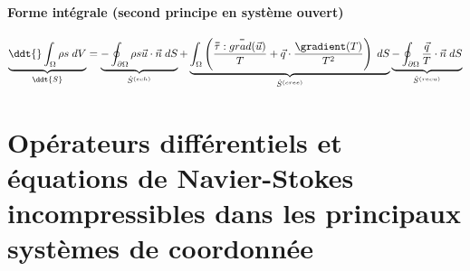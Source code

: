 \paragraph{Forme intégrale (second principe en système ouvert)}
\begin{equation}
		\underbrace{\ddt{} \int_{\Omega} \rho s \; dV
		}_{\ddt{S} }		 
		= \underbrace{  - \oint_{\partial \Omega}  \rho s \vec{u} \cdot \vec{n} \; dS
		}_{\dot{S}^{(ech)}}
		+ 
		\underbrace{ \int_{\Omega} \left( \frac{\mytensor{\tau} : \mytensor{grad}(\vec{u})}{T} + \vec{q} 		\cdot \frac{\gradient(T)}{T^2} 
		\right)   \; dS 
		}_{\dot{S}^{(cree)}} 
		 \underbrace{ - \oint_{\partial \Omega} \frac{\vec{q}}{T} \cdot \vec{n} \; dS
		}_{\dot{S}^{(recu)}} 
		\label{eq:bilan_global_eulerien_s}
\end{equation}








\section{Opérateurs différentiels et équations de Navier-Stokes incompressibles dans les principaux systèmes de coordonnée}










